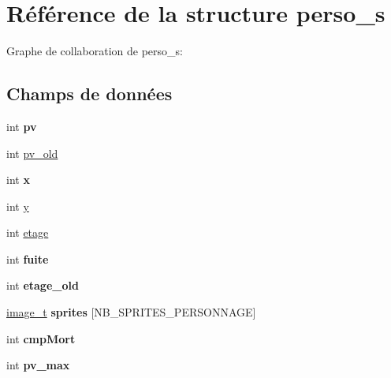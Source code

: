 \hypertarget{structperso__s}{}\section{Référence de la structure perso\+\_\+s}
\label{structperso__s}


Graphe de collaboration de perso\+\_\+s\+:
\subsection*{Champs de données}
\begin{DoxyCompactItemize}
\item 
\mbox{\label{structperso__s_ad17089bad3c048781a2add514f3f07d3}} 
int {\bfseries pv}
\item 
int \hyperlink{structperso__s_a297466e7436287f164f8657682eed1cc}{pv\+\_\+old}
\item 
\mbox{\label{structperso__s_a99f045874e46e0662e64f0525172ad4c}} 
int {\bfseries x}
\item 
int \hyperlink{structperso__s_a74f226bdc5f8237c573fa5f54d10a44e}{y}
\item 
int \hyperlink{structperso__s_a833e982a2a21762795c06ebbc0061f32}{etage}
\item 
\mbox{\label{structperso__s_a40f197f662fb0932f15fc896c1abae66}} 
int {\bfseries fuite}
\item 
\mbox{\label{structperso__s_a91fc1227b30f6b31c5f9ae9fda6cf90c}} 
int {\bfseries etage\+\_\+old}
\item 
\mbox{\label{structperso__s_ac7d1926bb25ca167223e5ff20e4dba43}} 
\hyperlink{structimage__t}{image\+\_\+t} {\bfseries sprites} \mbox{[}N\+B\+\_\+\+S\+P\+R\+I\+T\+E\+S\+\_\+\+P\+E\+R\+S\+O\+N\+N\+A\+GE\mbox{]}
\item 
\mbox{\label{structperso__s_a27499f2ab32de3b5493baa701e40bba8}} 
int {\bfseries cmp\+Mort}
\item 
\mbox{\label{structperso__s_aba3cc8e96ff23105ee14c2e9482f856a}} 
int {\bfseries pv\+\_\+max}
\end{DoxyCompactItemize}


